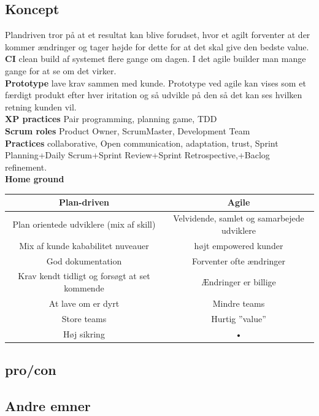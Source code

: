 \documentclass[11pt,a4paper]{article}
\begin{document}
\subsection{Koncept}
Plandriven tror på at et resultat kan blive forudset, hvor et agilt forventer at der kommer ændringer og tager højde for dette for at det skal give den bedste value.\\
\textbf{CI} clean build af systemet flere gange om dagen. I det agile builder man mange gange for at se om det virker.\\
\textbf{Prototype} lave krav sammen med kunde. Prototype ved agile kan vises som et færdigt produkt efter hver iritation og så udvikle på den så det kan ses hvilken retning kunden vil.\\
\textbf{XP practices} Pair programming, planning game, TDD\\
\textbf{Scrum roles} Product Owner, ScrumMaster, Development Team\\
\textbf{Practices} collaborative, Open communication, adaptation, trust, Sprint Planning+Daily Scrum+Sprint Review+Sprint Retrospective,+Baclog refinement.\\
\textbf{Home ground}\\
\begin{tabular}{|c|c|}
\hline 
\textbf{Plan-driven} & \textbf{Agile} \\ 
\hline 
Plan orientede udviklere (mix af skill) & Velvidende, samlet og samarbejede udviklere \\ 
\hline 
Mix af kunde kababilitet nuveauer & højt empowered kunder \\ 
\hline 
God dokumentation & Forventer ofte ændringer \\ 
\hline 
Krav kendt tidligt og forsøgt at set kommende & Ændringer er billige \\ 
\hline 
At lave om er dyrt & Mindre teams \\ 
\hline 
Store teams & Hurtig ”value” \\ 
\hline 
Høj sikring & • \\ 
\hline 
\end{tabular} 


\subsection{pro/con}
\subsection{Andre emner}
\end{document}
